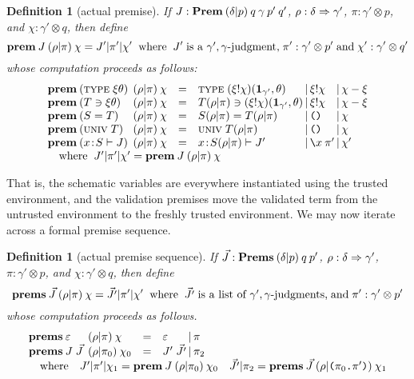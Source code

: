 \documentclass{jfp1}
\newtheorem{definition}[theorem]{Definition}
\newcommand{\emp}{\varepsilon}
\newcommand{\Pa}[1]{\texttt{(}#1\texttt{)}}
\newcommand{\dt}{\texttt{.}}
\newcommand{\cn}[2]{\Pa{#1 \dt #2}}
\begin{document}
\newcommand{\prem}[4]{\textbf{prem}\:#1\:\ssc{#2}{#3}\:#4}
\newcommand{\prems}[4]{\textbf{prems}\:#1\:\ssc{#2}{#3}\:#4}
\begin{definition}[actual premise]
  If $J : \textbf{Prem}\:(\delta|p)\:q\:\gamma\:p'\:q'$, $\rho : \delta\Rightarrow\gamma'$,
  $\pi : \gamma'\otimes
  p$, and $\chi : \gamma'\otimes q$, then define
  \[\prem J\rho\pi\chi = J'|\pi'|\chi'\;\;\mbox{where}\;\;
    J'\;\mbox{is a $\gamma',\gamma$-judgment,}\;
    \pi' : \gamma'\otimes p'\;\mbox{and}\; \chi':\gamma'\otimes q'
  \]
  whose computation proceeds as follows:
  \[\begin{array}{l@{\:}lcl@{\,|\,}l@{\,|\,}l}
      \prem{(\ty{\xi\theta})&}\rho\pi\chi & =
      & \ty{(\sel\xi\chi)(\ith_{\gamma'},\theta)}
      & \sel\xi\chi & \chi-\xi \\
      \prem{(\chk T{\xi\theta})&}\rho\pi\chi & =
      & \chk{T\ssc\rho\pi}{(\sel\xi\chi)(\ith_{\gamma'},\theta)}
      & \sel\xi\chi & \chi-\xi \\
      \prem{(S=T)&}\rho\pi\chi & =
      & S\ssc\rho\pi=T\ssc\rho\pi & \Pa{} & \chi \\
      \prem{(\univ T)&}\rho\pi\chi & =
      & \univ{T\ssc\rho\pi} & \Pa{} & \chi \\
      \prem{(\cxe xS J)&}\rho\pi\chi & =
      & \cxe x{S\ssc\rho\pi}J' & \la x\pi' & \chi'\\
      \multicolumn{6}{l}{\quad  \mbox{where} \;\;J'|\pi'|\chi' = \prem J\rho\pi\chi}
  \end{array}\]
\end{definition}

That is, the schematic variables are everywhere instantiated using the
trusted environment, and the validation premises move the validated
term from the untrusted environment to the freshly trusted
environment. We may now iterate across a formal premise sequence.

\begin{definition}[actual premise sequence]
  If $\vec J : \textbf{Prems}\:(\delta|p)\:q\:p'$,  $\rho : \delta\Rightarrow\gamma'$,
  $\pi : \gamma'\otimes p$, and $\chi : \gamma'\otimes q$, then define
  \[\prems{\vec J}\rho\pi\chi = \vec{J'}|\pi'|\chi'\;\;\mbox{where}\;\;
    \vec{J'}\;\mbox{is a list of $\gamma',\gamma$-judgments,}\;\mbox{and}\;
    \pi' : \gamma'\otimes p'
  \]
  whose computation proceeds as follows.
  \[\begin{array}{l@{\:}lcl@{\,|\,}l}
      \prems{\emp&}\rho\pi\chi & = & \emp & \pi \\
      \prems{J\;\vec J&}\rho{\pi_0}{\chi_0} & = & J'\;\vec{J'} & \pi_2
      \\
      \multicolumn{5}{l}{\quad \mbox{where}\quad
      J'|\pi'|\chi_1 = \prem J\rho{\pi_0}{\chi_0}\quad
      \vec{J'}|\pi_2 = \prems{\vec J}\rho{\cn{\pi_0}{\pi'}}{\chi_1}
      }
  \end{array}\]
\end{definition}
\end{document}

